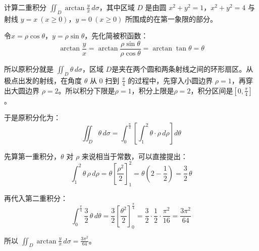 \begin{myexample}
    计算二重积分 \(\iint_D \arctan\frac{y}{x}\,d\sigma\)，其中区域 \(D\) 是由圆 \(x^2+y^2=1\)，\(x^2+y^2=4\) 与射线 \(y=x\ (x\ge 0)\)，\(y=0\ (x\ge 0)\) 所围成的在第一象限的部分。

    令$x = \rho\cos\theta$，$y = \rho\sin\theta$，先化简被积函数：
    \[
    \arctan\frac{y}{x}=\arctan\frac{\rho\sin\theta}{\rho\cos\theta}=\arctan\tan\theta=\theta
    \]

    所以原积分就是 \(\iint_D \theta\,d\sigma\)，区域 \(D\)是夹在两个圆和两条射线之间的环形扇区。从极点出发的射线，在角度 \(\theta\) 从 \(0\) 扫到 \(\frac{\pi}{4}\) 的过程中，先穿入小圆边界 \(\rho=1\)，再穿出大圆边界 \(\rho=2\)。所以积分下限是\(\rho=1\)，积分上限是\(\rho=2\)，积分区间是\([0,\frac{\pi}{4}]\)。

\begin{center}
\end{center}

    于是原积分化为：
    \[
    \iint_D \theta\,d\sigma = \int_0^{\frac{\pi}{4}}\left[\int_1^2 \theta \cdot \rho\,d\rho\right]d\theta
    \]

    先算第一重积分，\(\theta\) 对 \(\rho\) 来说相当于常数，可以直接提出：
    \[
    \int_1^2 \theta\,\rho\,d\rho = \theta\left[\frac{\rho^2}{2}\right]_1^2 = \theta(2-\frac12) = \frac32\,\theta
    \]

    再代入第二重积分：
    \[
    \int_0^{\frac{\pi}{4}} \frac32\,\theta\,d\theta = \frac32\left[\frac{\theta^2}{2}\right]_0^{\frac{\pi}{4}} = \frac32\cdot\frac12\cdot\frac{\pi^2}{16} = \frac{3\pi^2}{64}
    \]

    所以 \(\iint_D \arctan\frac{y}{x}\,d\sigma = \frac{3\pi^2}{64}\)。
\end{myexample}

